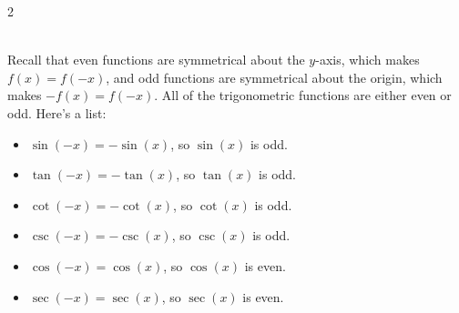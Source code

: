 \begin{multicols}{2}
	\begin{myDefinition}~\\[0.5mm]
		Recall that even functions are symmetrical about the $y$-axis, which makes 
		$f(x)=f(-x)$, and odd functions are symmetrical about the origin, which makes $-f(x)=f(-x)$. All of the trigonometric functions are either even or odd. Here's a list:
		\columnbreak
		\begin{itemize}
			\item $\sin(-x)=-\sin(x)$, so $\sin(x)$ is odd.
			\item $\tan(-x)=-\tan(x)$, so $\tan(x)$ is odd.
			\item $\cot(-x)=-\cot(x)$, so $\cot(x)$ is odd.
			\item $\csc(-x)=-\csc(x)$, so $\csc(x)$ is odd.
			\item $\cos(-x)=\cos(x)$, so $\cos(x)$ is even.
			\item $\sec(-x)=\sec(x)$, so $\sec(x)$ is even.
		\end{itemize}
	\end{myDefinition}
\end{multicols}

\vfill

